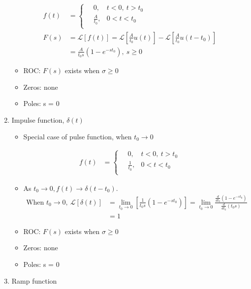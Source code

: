 \documentclass[a4paper]{article}
\begin{document}
\begin{enumerate}[label=\alph*.]
\begin{align*}
        f(t) &= \begin{cases}
        \quad 0, & t<0,\ t>t_0\\
        \quad \displaystyle\frac{A}{t_0},& 0<t<t_0 \\
        \end{cases}\\
        F(s) &= \mathscr{L}[f(t)] = \mathscr{L}\left[\frac{A}{t_0}u(t)\right] - \mathscr{L}\left[\frac{A}{t_0}u(t-t_0)\right]\\
        &= \frac{A}{t_0s}(1-e^{-st_0}),\ s \geq 0 
    \end{align*}
    \begin{itemize}
        \item ROC: $F(s)$ exists when $\sigma \geq 0$
        \item Zeros: none
        \item Poles: s = 0
    \end{itemize}
    \item Impulse function, $\delta(t)$
    \begin{itemize}
        \item Special case of pulse function, when $t_0 \to 0$
    \end{itemize}
    \begin{align*}
        f(t) &= \begin{cases}
        \quad 0, & t<0,\ t>t_0\\
        \quad \displaystyle\frac{1}{t_0},& 0<t<t_0 \\
        \end{cases}
    \end{align*}
    \begin{itemize}
        \item As $t_0\to 0, f(t)\to \delta(t-t_0)$.
        \begin{align*}
            \text{When }t_0\to 0,\ \mathscr{L}[\delta(t)] &= \lim_{t_0\to 0}\left[\frac{1}{t_0s}(1-e^{-st_0})\right] = \lim_{t_0\to 0} \frac{\frac{d}{dt_0}(1-e^{-st_0})}{\frac{d}{dt_0}(t_0s)}\\
            &= 1
        \end{align*}
        \item ROC: $F(s)$ exists when $\sigma \geq 0$
        \item Zeros: none
        \item Poles: s = 0
    \end{itemize}
    \newpage
    \item Ramp function
    \begin{align*}

\end{align*}
\end{enumerate}
\end{document}
